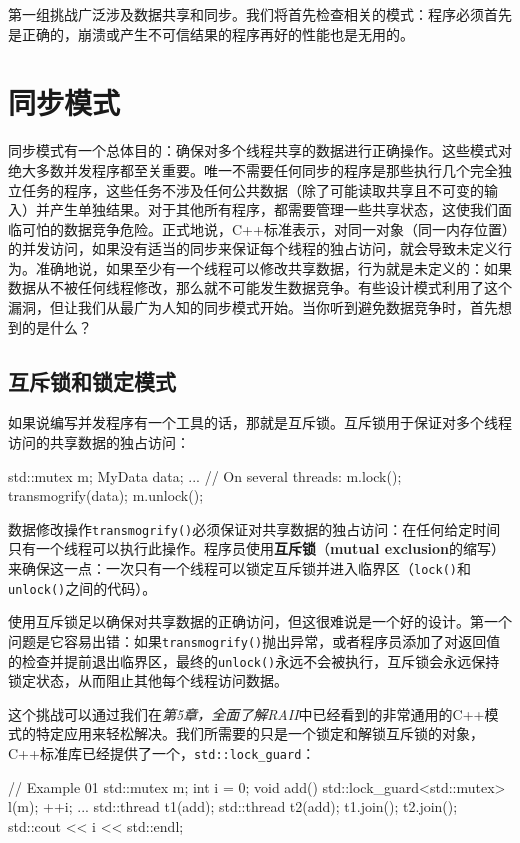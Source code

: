 第一组挑战广泛涉及数据共享和同步。我们将首先检查相关的模式：程序必须首先是正确的，崩溃或产生不可信结果的程序再好的性能也是无用的。

\section{同步模式}

同步模式有一个总体目的：确保对多个线程共享的数据进行正确操作。这些模式对绝大多数并发程序都至关重要。唯一不需要任何同步的程序是那些执行几个完全独立任务的程序，这些任务不涉及任何公共数据（除了可能读取共享且不可变的输入）并产生单独结果。对于其他所有程序，都需要管理一些共享状态，这使我们面临可怕的数据竞争危险。正式地说，C++标准表示，对同一对象（同一内存位置）的并发访问，如果没有适当的同步来保证每个线程的独占访问，就会导致未定义行为。准确地说，如果至少有一个线程可以修改共享数据，行为就是未定义的：如果数据从不被任何线程修改，那么就不可能发生数据竞争。有些设计模式利用了这个漏洞，但让我们从最广为人知的同步模式开始。当你听到避免数据竞争时，首先想到的是什么？

\subsection{互斥锁和锁定模式}

如果说编写并发程序有一个工具的话，那就是互斥锁。互斥锁用于保证对多个线程访问的共享数据的独占访问：

\begin{code}
std::mutex m;
MyData data;
...
// On several threads:
m.lock();
transmogrify(data);
m.unlock();
\end{code}

数据修改操作\texttt{transmogrify()}必须保证对共享数据的独占访问：在任何给定时间只有一个线程可以执行此操作。程序员使用\textbf{互斥锁}（\textbf{mutual exclusion}的缩写）来确保这一点：一次只有一个线程可以锁定互斥锁并进入临界区（\texttt{lock()}和\texttt{unlock()}之间的代码）。

使用互斥锁足以确保对共享数据的正确访问，但这很难说是一个好的设计。第一个问题是它容易出错：如果\texttt{transmogrify()}抛出异常，或者程序员添加了对返回值的检查并提前退出临界区，最终的\texttt{unlock()}永远不会被执行，互斥锁会永远保持锁定状态，从而阻止其他每个线程访问数据。

这个挑战可以通过我们在\emph{第5章，全面了解RAII}中已经看到的非常通用的C++模式的特定应用来轻松解决。我们所需要的只是一个锁定和解锁互斥锁的对象，C++标准库已经提供了一个，\texttt{std::lock\_guard}：

\begin{code}
// Example 01
std::mutex m;
int i = 0;
void add() {
  std::lock_guard<std::mutex> l(m);
  ++i;
}
...
std::thread t1(add);
std::thread t2(add);
t1.join();
t2.join();
std::cout << i << std::endl;
\end{code}

